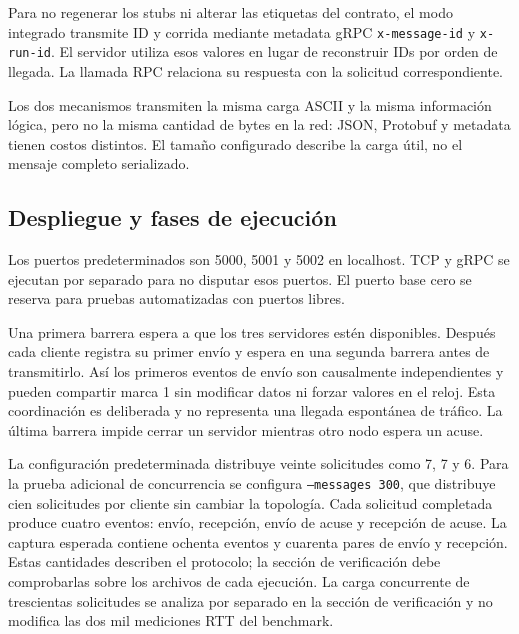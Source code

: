 Para no regenerar los stubs ni alterar las etiquetas del contrato, el modo
integrado transmite ID y corrida mediante metadata gRPC
\texttt{x-message-id} y \texttt{x-run-id}. El servidor utiliza esos valores
en lugar de reconstruir IDs por orden de llegada. La llamada RPC relaciona
su respuesta con la solicitud correspondiente.

Los dos mecanismos transmiten la misma carga ASCII y la misma información
lógica, pero no la misma cantidad de bytes en la red: JSON, Protobuf y metadata
tienen costos distintos. El tamaño configurado describe la carga útil, no el
mensaje completo serializado.

\subsection{Despliegue y fases de ejecución}
Los puertos predeterminados son 5000, 5001 y 5002 en localhost. TCP y gRPC se
ejecutan por separado para no disputar esos puertos. El puerto base cero se
reserva para pruebas automatizadas con puertos libres.

Una primera barrera espera a que los tres servidores estén disponibles. Después
cada cliente registra su primer envío y espera en una segunda barrera antes de
transmitirlo. Así los primeros eventos de envío son causalmente independientes
y pueden compartir marca 1 sin modificar datos ni forzar valores en el reloj.
Esta coordinación es deliberada y no representa una llegada espontánea de tráfico.
La última barrera impide cerrar un servidor mientras otro nodo espera un acuse.

La configuración predeterminada distribuye veinte solicitudes como 7, 7 y 6.
Para la prueba adicional de concurrencia se configura \texttt{--messages 300},
que distribuye cien solicitudes por cliente sin cambiar la topología.
Cada solicitud completada produce cuatro eventos: envío, recepción, envío de
acuse y recepción de acuse. La captura esperada contiene ochenta eventos y
cuarenta pares de envío y recepción. Estas cantidades describen el protocolo;
la sección de verificación debe comprobarlas sobre los archivos de cada ejecución.
La carga concurrente de trescientas solicitudes se analiza por separado en la
sección de verificación y no modifica las dos mil mediciones RTT del benchmark.
